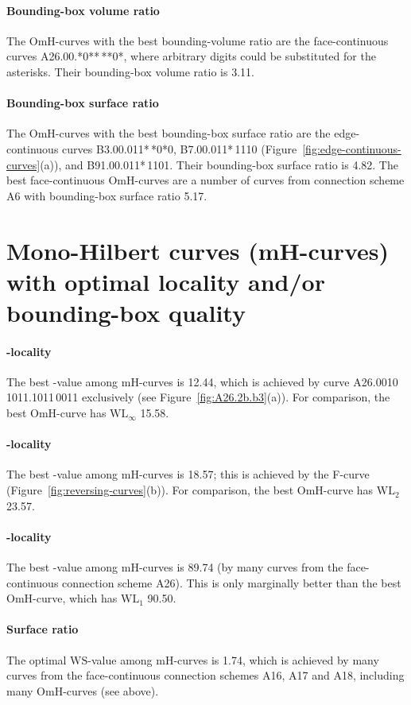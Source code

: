 \documentclass[11pt,a4paper]{article}
\def\WLMax{\ensuremath{\mathrm{WL}_\infty}\xspace}
\def\WLEuc{\ensuremath{\mathrm{WL}_2}\xspace}
\def\WLMan{\ensuremath{\mathrm{WL}_1}\xspace}
\def\WS{\ensuremath{\mathrm{WS}}\xspace}
\begin{document}
{\paragraph{Bounding-box volume ratio}
The OmH-curves with the best bounding-volume ratio are the face-continuous curves A26.00.*0**\,**0*, where arbitrary digits could be substituted for the asterisks. Their bounding-box volume ratio is 3.11.

\paragraph{Bounding-box surface ratio}
The OmH-curves with the best bounding-box surface ratio are the edge-continuous curves B3.00.011*\,*0*0, B7.00.011*\,1110 (Figure~\ref{fig:edge-continuous-curves}(a)), and B91.00.011*\,1101. Their bounding-box surface ratio is 4.82. The best face-continuous OmH-curves are a number of curves from connection scheme A6 with bounding-box surface ratio 5.17.

\section{Mono-Hilbert curves (mH-curves) with optimal locality and/or bounding-box quality}

\paragraph{-locality}
The best -value among mH-curves is 12.44, which is achieved by curve A26.0010\,1011.1011\,0011 exclusively (see Figure~\ref{fig:A26.2b.b3}(a)). For comparison, the best OmH-curve has \WLMax 15.58.

\paragraph{-locality}
The best -value among mH-curves is 18.57; this is achieved by the F-curve (Figure~\ref{fig:reversing-curves}(b)). For comparison, the best OmH-curve has \WLEuc 23.57.


\paragraph{-locality}
The best -value among mH-curves is 89.74 (by many curves from the face-continuous connection scheme A26). This is only marginally better than the best OmH-curve, which has \WLMan 90.50.


\paragraph{Surface ratio}
The optimal \WS-value among mH-curves is 1.74, which is achieved by many curves from the face-continuous connection schemes A16, A17 and A18, including many OmH-curves (see above).

}
\end{document}
